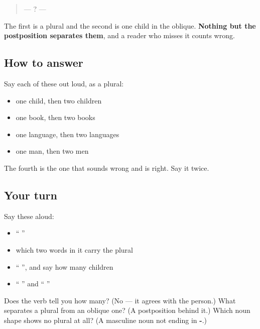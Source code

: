 \begin{quote}
—   ? —    
\end{quote}

The first \textbf{} is a plural and the second is one child in the oblique. \textbf{Nothing but the postposition separates them}, and a reader who misses it counts wrong.

\subsection*{How to answer}
Say each of these out loud, as a plural:

\begin{itemize}
\raggedright
  \item one child, then two children
  \item one book, then two books
  \item one language, then two languages
  \item one man, then two men
\end{itemize}

The fourth is the one that sounds wrong and is right. Say it twice.

\subsection*{Your turn}
Say these aloud:

\begin{itemize}
\raggedright
  \item \textquotedblleft{}   \textquotedblright{}
  \item which two words in it carry the plural
  \item \textquotedblleft{} \textquotedblright{}, and say how many children
  \item \textquotedblleft{} \textquotedblright{} and \textquotedblleft{} \textquotedblright{}
\end{itemize}

\begin{tcolorbox}[breakable,colback=teal!4,colframe=teal!35!black,title={Before you move on}]
Does the verb tell you how many? (No — it agrees with the person.) What separates a plural \textbf{} from an oblique one? (A postposition behind it.) Which noun shape shows no plural at all? (A masculine noun not ending in \textbf{-}.)
\end{tcolorbox}
